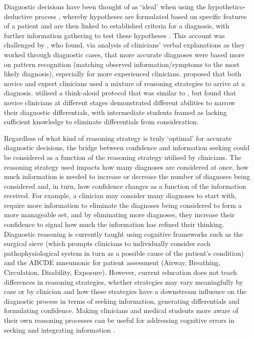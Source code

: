 \documentclass[a4paper, nobind]{templates/ociamthesis}
\begin{document}
\hfill\break
Diagnostic decisions have been thought of as `ideal' when using the hypothetico-deductive process \autocite{kuipers_causal_1984}, whereby hypotheses are formulated based on specific features of a patient and are then linked to established criteria for a diagnosis, with further information gathering to test these hypotheses \autocite{higgs_clinical_2019}. This account was challenged by \textcite{coderre_diagnostic_2003}, who found, via analysis of clinicians' verbal explanations as they worked through diagnostic cases, that more accurate diagnoses were based more on pattern recognition (matching observed information/symptoms to the most likely diagnosis), especially for more experienced clinicians. \autocite{gilhooly_cognitive_1990} proposed that both novice and expert clinicians used a mixture of reasoning strategies to arrive at a diagnosis. \autocite{arocha_novice_1995} utilised a think-aloud protocol that was similar to \textcite{coderre_diagnostic_2003}, but found that novice clinicians at different stages demonstrated different abilities to narrow their diagnostic differentials, with intermediate students framed as lacking sufficient knowledge to eliminate differentials from consideration.

Regardless of what kind of reasoning strategy is truly `optimal' for accurate diagnostic decisions, the bridge between confidence and information seeking could be considered as a function of the reasoning strategy utilised by clinicians. The reasoning strategy used impacts how many diagnoses are considered at once, how much information is needed to increase or decrease the number of diagnoses being considered and, in turn, how confidence changes as a function of the information received. For example, a clinician may consider many diagnoses to start with, require more information to eliminate the diagnoses being considered to form a more manageable set, and by eliminating more diagnoses, they increase their confidence to signal how much the information has refined their thinking. Diagnostic reasoning is currently taught using cognitive frameworks such as the surgical sieve (which prompts clinicians to individually consider each pathophysiological system in turn as a possible cause of the patient's condition) and the ABCDE mneumonic for patient assessment (Airway, Breathing, Circulation, Disability, Exposure). However, current education does not teach differences in reasoning strategies, whether strategies may vary meaningfully by case or by clinician and how these strategies have a downstream influence on the diagnostic process in terms of seeking information, generating differentials and formulating confidence. Making clinicians and medical students more aware of their own reasoning processes can be useful for addressing cognitive errors in seeking and integrating information \autocite{nendaz_diagnostic_2012}.
\end{document}
